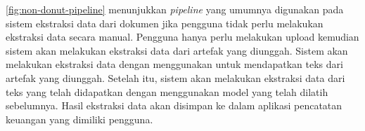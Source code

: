 \autoref{fig:non-donut-pipeline} menunjukkan \emph{pipeline} yang umumnya digunakan pada sistem ekstraksi data dari dokumen jika pengguna tidak perlu melakukan ekstraksi data secara manual. Pengguna hanya perlu melakukan upload kemudian sistem akan melakukan ekstraksi data dari artefak yang diunggah. Sistem akan melakukan ekstraksi data dengan menggunakan \ocr{} untuk mendapatkan teks dari artefak yang diunggah. Setelah itu, sistem akan melakukan ekstraksi data dari teks yang telah didapatkan dengan menggunakan model yang telah dilatih sebelumnya. Hasil ekstraksi data akan disimpan ke dalam aplikasi pencatatan keuangan yang dimiliki pengguna.

